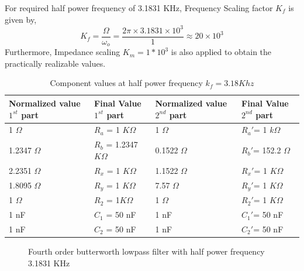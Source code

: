\documentclass[a4paper,11pt]{article}
\begin{document}
For required half power frequency of 3.1831 KHz, Frequency Scaling factor $K_f$ is given by,
\begin{equation}
    K_f=\frac{\Omega}{\omega_o}=\frac{2\pi\times3.1831\times10^3}{1}\approx 20\times10^3
\end{equation}
Furthermore, Impedance scaling $K_m= 1 *10^3$ is also applied to obtain the practically realizable values.

\begin{table}[H]
    \centering
    \begin{tabular}[H]{| m{8em}|m{8em}|m{8em}|m{8em}|}
        \hline
        \rowcolor[rgb]{0.569,0.647,0.947}
        \textbf{Normalized value $1^{st}$ part}
                          & \textbf{Final Value $1^{st}$ part}
                          & \textbf{Normalized value $2^{nd}$ part}
                          & \textbf{Final Value $2^{nd}$ part}                                                     \\
        \hline
        1 $ \Omega $      & $R_a$ = 1  $ K\Omega $                  & 1 $ \Omega $      & $R_a'$=  1 $ k\Omega $   \\ \hline
        1.2347 $ \Omega $ & $R_b$ = 1.2347 $ K\Omega $              & 0.1522 $ \Omega $ & $R_b'$= 152.2 $ \Omega $ \\ \hline
        2.2351 $ \Omega $ & $R_x$ = 1  $ K\Omega $                  & 1.1522 $ \Omega $ & $R_x'$= 1  $ K\Omega $   \\ \hline
        1.8095 $ \Omega $ & $R_y$ = 1  $ K\Omega $                  & 7.57 $ \Omega $   & $R_y'$= 1  $ K\Omega $   \\ \hline
        1 $ \Omega $      & $R_2$ = 1$ K\Omega $                    & 1 $ \Omega $      & $R_2'$= 1 $ K\Omega $    \\ \hline
        1 nF              & $C_1$ = 50 nF                           & 1 nF              & $C_1'$=   50 nF          \\ \hline
        1 nF              & $C_2$ = 50 nF                           & 1 nF              & $C_2'$=    50 nF         \\ \hline
    \end{tabular}
    \caption{Component values at half power frequency $k_f =3.18 Khz$}
\end{table}

\begin{figure}[H]
    \centering
    \scalebox{1.15}
    \figfourthorderfinal
    \caption{Fourth order butterworth lowpass filter with half power frequency 3.1831 KHz}
\end{figure}
\end{document}
